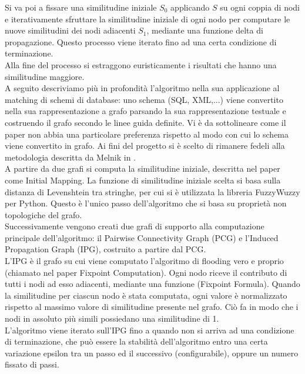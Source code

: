\documentclass{article}
\begin{document}
Si va poi a fissare una similitudine iniziale $S_0$ applicando $S$ su ogni coppia di nodi e iterativamente sfruttare la similitudine iniziale di ogni nodo per computare le nuove similitudini dei nodi adiacenti $S_1$, mediante una funzione delta di propagazione. Questo processo viene iterato fino ad una certa condizione di terminazione.\\

Alla fine del processo si estraggono euristicamente i risultati che hanno una similitudine maggiore.\\

A seguito descriviamo più in profondità l’algoritmo nella sua applicazione al matching di schemi di database: uno schema (SQL, XML,...) viene convertito nella sua rappresentazione a grafo parsando la sua rappresentazione testuale e costruendo il grafo secondo le linee guida definite. Vi è da sottolineare come il paper non abbia una particolare preferenza rispetto al modo con cui lo schema viene convertito in grafo. Ai fini del progetto si è scelto di rimanere fedeli alla metodologia descritta da Melnik in \citep{generic_model_man}.\\

A partire da due grafi si computa la similitudine iniziale, descritta nel paper come Initial Mapping. La funzione di similitudine iniziale scelta si basa sulla distanza di Levenshtein tra stringhe, per cui si è utilizzata la libreria FuzzyWuzzy per Python. Questo è l’unico passo dell’algoritmo che si basa su proprietà non topologiche del grafo.\\

Successivamente vengono creati due grafi di supporto alla computazione principale dell’algoritmo: il Pairwise Connectivity Graph (PCG) e l’Induced Propagation Graph (IPG), costruito a partire dal PCG.\\

L’IPG è il grafo su cui viene computato l’algoritmo di flooding vero e proprio (chiamato nel paper Fixpoint Computation). Ogni nodo riceve il contributo di tutti i nodi ad esso adiacenti, mediante una funzione (Fixpoint Formula). Quando la similitudine per ciascun nodo è stata computata, ogni valore è normalizzato rispetto al massimo valore di similitudine presente nel grafo. Ciò fa in modo che i nodi in assoluto più simili possiedano una similitudine di 1.\\

L’algoritmo viene iterato sull’IPG fino a quando non si arriva ad una condizione di terminazione, che può essere la stabilità dell’algoritmo entro una certa variazione epsilon tra un passo ed il successivo (configurabile), oppure un numero fissato di passi.\\
\end{document}

